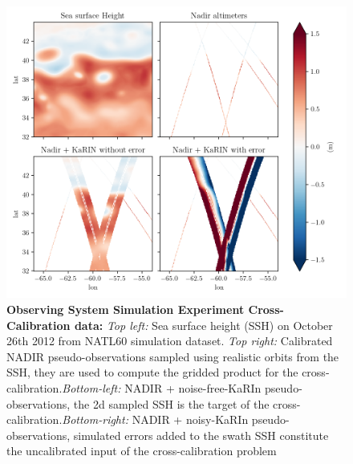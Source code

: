 \begin{bibunit}
\begin{figure}[!t]
    \begin{center}
        \includegraphics[width=\linewidth]{00_Calib/gridded_sensors.png}
    \end{center}
    \caption{\textbf{Observing System Simulation Experiment Cross-Calibration data:} \textit{Top left:} Sea surface height (SSH) on October 26th 2012 from NATL60 simulation dataset. \textit{Top right:} Calibrated NADIR pseudo-observations sampled using realistic orbits from the SSH, they are used to compute the gridded product for the cross-calibration.\textit{Bottom-left:} NADIR + noise-free-KaRIn pseudo-observations, the  2{\sc d} sampled SSH is the target of the cross-calibration.\textit{Bottom-right:} NADIR + noisy-KaRIn pseudo-observations, simulated errors added to the swath SSH constitute the uncalibrated input of the cross-calibration problem}
\label{c3fig:gridded}
\end{figure}


\end{bibunit}
